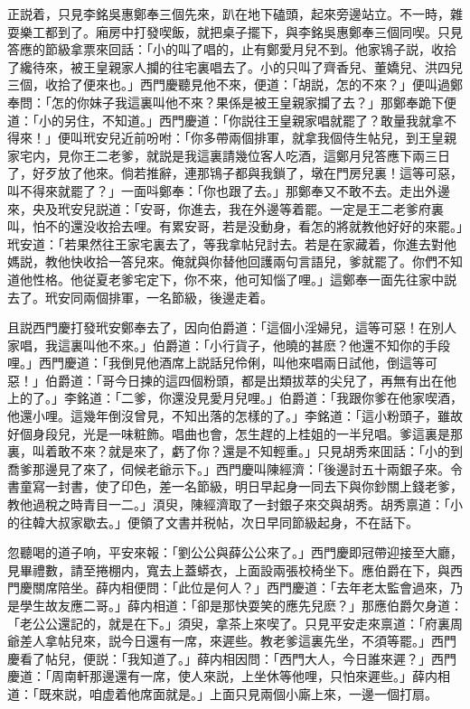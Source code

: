 正説着，只見李銘吳惠鄭奉三個先來，趴在地下磕頭，起來旁邊站立。不一時，雜耍樂工都到了。廂房中打發喫飯，就把桌子擺下，與李銘吳惠鄭奉三個同喫。只見答應的節級拿票來回話：「小的叫了唱的，止有鄭愛月兒不到。他家鴇子説，收拾了纔待來，被王皇親家人攔的往宅裏唱去了。小的只叫了齊香兒、董嬌兒、洪四兒三個，收拾了便來也。」西門慶聽見他不來，便道：「胡説，怎的不來？」便叫過鄭奉問：「怎的你妹子我這裏叫他不來？果係是被王皇親家攔了去？」那鄭奉跪下便道：「小的另住，不知道。」西門慶道：「你説往王皇親家唱就罷了？敢量我就拿不得來！」便叫玳安兒近前吩咐：「你多帶兩個排軍，就拿我個侍生帖兒，到王皇親家宅内，見你王二老爹，就説是我這裏請幾位客人吃酒，這鄭月兒答應下兩三日了，好歹放了他來。倘若推辭，連那鴇子都與我鎖了，墩在門房兒裏！這等可惡，叫不得來就罷了？」一面呌鄭奉：「你也跟了去。」那鄭奉又不敢不去。走出外邊來，央及玳安兒説道：「安哥，你進去，我在外邊等着罷。一定是王二老爹府裏叫，怕不的還没收拾去哩。有累安哥，若是没動身，看怎的將就教他好好的來罷。」玳安道：「若果然往王家宅裏去了，等我拿帖兒討去。若是在家藏着，你進去對他媽説，教他快收拾一答兒來。俺就與你替他回護兩句言語兒，爹就罷了。你們不知道他性格。他従夏老爹宅定下，你不來，他可知惱了哩。」這鄭奉一面先往家中説去了。玳安同兩個排軍，一名節級，後邊走着。

且説西門慶打發玳安鄭奉去了，因向伯爵道：「這個小淫婦兒，這等可惡！在別人家唱，我這裏叫他不來。」伯爵道：「小行貨子，他曉的甚麽？他還不知你的手段哩。」西門慶道：「我倒見他酒席上説話兒伶俐，叫他來唱兩日試他，倒這等可惡！」伯爵道：「哥今日揀的這四個粉頭，都是出類拔萃的尖兒了，再無有出在他上的了。」李銘道：「二爹，你還没見愛月兒哩。」伯爵道：「我跟你爹在他家喫酒，他還小哩。這幾年倒沒曾見，不知出落的怎樣的了。」李銘道：「這小粉頭子，雖故好個身段兒，光是一味粧飾。唱曲也會，怎生趕的上桂姐的一半兒唱。爹這裏是那裏，叫着敢不來？就是來了，虧了你？還是不知輕重。」只見胡秀來囬話：「小的到喬爹那邊見了來了，伺候老爺示下。」西門慶叫陳經濟：「後邊討五十兩銀子來。令書童寫一封書，使了印色，差一名節級，明日早起身一同去下與你鈔關上錢老爹，教他過稅之時青目一二。」湏臾，陳經濟取了一封銀子來交與胡秀。胡秀禀道：「小的往韓大叔家歇去。」便領了文書并税帖，次日早同節級起身，不在話下。

忽聽喝的道子响，平安來報：「劉公公與薛公公來了。」西門慶即冠帶迎接至大廳，見畢禮數，請至捲棚内，寬去上蓋蟒衣，上面設兩張校椅坐下。應伯爵在下，與西門慶關席陪坐。薛内相便問：「此位是何人？」西門慶道：「去年老太監會過來，乃是學生故友應二哥。」薛内相道：「卻是那快耍笑的應先兒麽？」那應伯爵欠身道：「老公公還記的，就是在下。」須臾，拿茶上來喫了。只見平安走來禀道：「府裏周爺差人拿帖兒來，説今日還有一席，來遲些。教老爹這裏先坐，不須等罷。」西門慶看了帖兒，便説：「我知道了。」薛内相因問：「西門大人，今日誰來遲？」西門慶道：「周南軒那邊還有一席，使人來説，上坐休等他哩，只怕來遲些。」薛内相道：「既來説，咱虚着他席面就是。」上面只見兩個小廝上來，一邊一個打扇。

